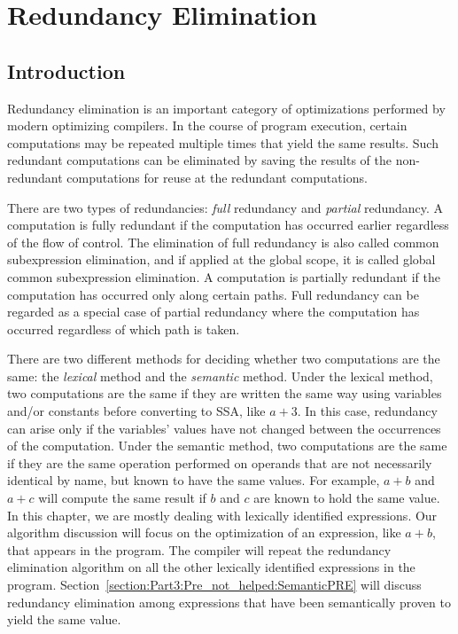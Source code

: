 \chapter{Redundancy Elimination }
\graphicspath{{img/}{pre_not_helped/img/}{part3/pre_not_helped/img/}}

\section{Introduction}

Redundancy elimination is an 
important category of optimizations performed by modern optimizing compilers.
In the course of program execution, certain computations may be repeated
multiple times that yield the same results.  Such redundant
computations can be eliminated by saving the results of the non-redundant 
computations for reuse at the redundant computations.

There are two types of redundancies: \emph{full} redundancy and 
\emph{partial} redundancy.  A computation is fully redundant if the 
computation has occurred earlier regardless of the flow of control.
The elimination of full redundancy is also called common subexpression
elimination, and if applied at the global scope, it is called global common
subexpression elimination.  A computation is partially redundant if the 
computation has occurred only along certain paths.  Full redundancy can be
regarded as a special case of partial redundancy where the computation has
occurred regardless of which path is taken.

There are two different methods for deciding whether two computations are the 
same: the \emph{lexical} method and the \emph{semantic} method.  
Under the lexical method, two computations are the same if they
are written the same way using variables and/or constants before converting
to SSA, like $a+3$.  In this case, redundancy can arise only if the 
variables' values have not changed between the occurrences of the computation.
Under the semantic method, two computations are the same if they are 
the same operation performed on operands that are
not necessarily identical by name, but known to have the same values.
For example, $a+b$ and $a+c$ will compute the same result
if $b$ and $c$ are known to hold the same value.
In this chapter, we are mostly dealing with lexically identified
expressions.  Our algorithm discussion will focus on the optimization of an
expression, like $a+b$, that appears in the program.
The compiler will repeat the redundancy elimination algorithm on all the other 
lexically identified expressions in the program.
Section~\ref{section:Part3:Pre_not_helped:SemanticPRE} will discuss redundancy 
elimination among expressions that have been semantically proven to yield 
the same value.

